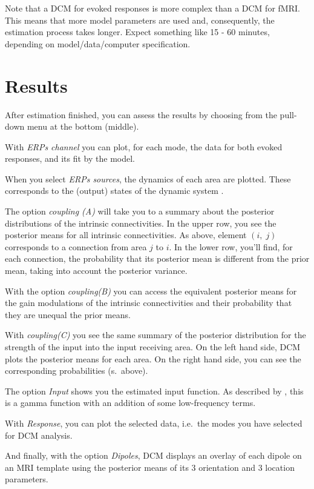 Note that a DCM for evoked responses is more complex than a
DCM for fMRI. This means that more model parameters are used and,
consequently, the estimation process takes longer. Expect something
like 15 - 60 minutes, depending on model/data/computer specification.

\section{Results}After estimation finished, you can assess the results by choosing from
the pull-down menu at the bottom (middle). 

With \textit{ERPs channel} you can plot, for each mode, the data for
both evoked responses, and its fit by the model. 

When you select \textit{ERPs sources}, the dynamics of each area are
plotted. These corresponds to the (output) states of the dynamic
system \cite{david_dcm_erp}.

The option \textit{coupling (A)} will take you to a summary about the
posterior distributions of the intrinsic connectivities. In the upper
row, you see the posterior means for all intrinsic connectivities. As
above, element $(i,\; j)$ corresponds to a connection from area $j$
to $i$. In the lower row, you'll find, for each connection, the
probability that its posterior mean is different from the prior
mean, taking into account the posterior variance.

With the option \textit{coupling(B)} you can access the equivalent
posterior means for the gain modulations of the intrinsic
connectivities and their probability that they are unequal the prior
means.

With \textit{coupling(C)} you see the same summary of the posterior
distribution for the strength of the input into the input receiving
area. On the left hand side, DCM plots the posterior means for each
area. On the right hand side, you can see the corresponding
probabilities (s.~above).

The option \textit{Input} shows you the estimated input function. As
described by \cite{david_dcm_erp}, this is a gamma function with an
addition of some low-frequency terms.

With \textit{Response}, you can plot the selected data, i.e.~the modes
you have selected for DCM analysis.

And finally, with the option \textit{Dipoles}, DCM displays an
overlay of each dipole on an MRI template using the posterior means of
its 3 orientation and 3 location parameters.


 

